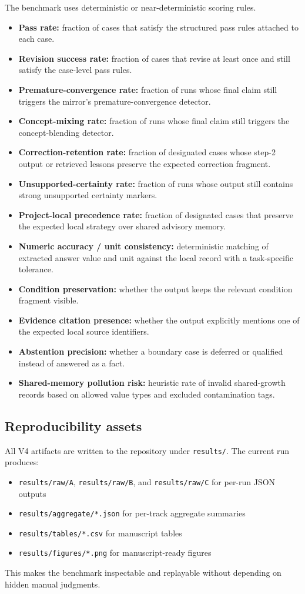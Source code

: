 \documentclass[12pt]{article}
\begin{document}
The benchmark uses deterministic or near-deterministic scoring rules.
\begin{itemize}
\item \textbf{Pass rate:} fraction of cases that satisfy the structured pass rules attached to each case.
\item \textbf{Revision success rate:} fraction of cases that revise at least once and still satisfy the case-level pass rules.
\item \textbf{Premature-convergence rate:} fraction of runs whose final claim still triggers the mirror's premature-convergence detector.
\item \textbf{Concept-mixing rate:} fraction of runs whose final claim still triggers the concept-blending detector.
\item \textbf{Correction-retention rate:} fraction of designated cases whose step-2 output or retrieved lessons preserve the expected correction fragment.
\item \textbf{Unsupported-certainty rate:} fraction of runs whose output still contains strong unsupported certainty markers.
\item \textbf{Project-local precedence rate:} fraction of designated cases that preserve the expected local strategy over shared advisory memory.
\item \textbf{Numeric accuracy / unit consistency:} deterministic matching of extracted answer value and unit against the local record with a task-specific tolerance.
\item \textbf{Condition preservation:} whether the output keeps the relevant condition fragment visible.
\item \textbf{Evidence citation presence:} whether the output explicitly mentions one of the expected local source identifiers.
\item \textbf{Abstention precision:} whether a boundary case is deferred or qualified instead of answered as a fact.
\item \textbf{Shared-memory pollution risk:} heuristic rate of invalid shared-growth records based on allowed value types and excluded contamination tags.
\end{itemize}

\subsection{Reproducibility assets}

All V4 artifacts are written to the repository under \texttt{results/}. The current run produces:
\begin{itemize}
\item \texttt{results/raw/A}, \texttt{results/raw/B}, and \texttt{results/raw/C} for per-run JSON outputs
\item \texttt{results/aggregate/*.json} for per-track aggregate summaries
\item \texttt{results/tables/*.csv} for manuscript tables
\item \texttt{results/figures/*.png} for manuscript-ready figures
\end{itemize}
This makes the benchmark inspectable and replayable without depending on hidden manual judgments.
\end{document}
